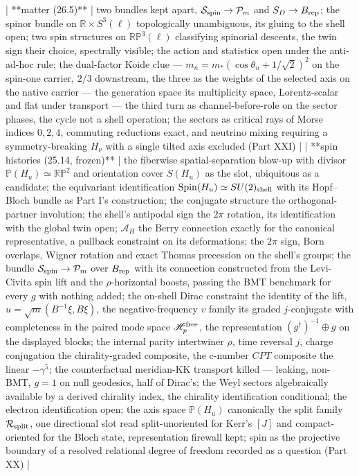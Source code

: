 | **matter (26.5)** | two bundles kept apart, $\mathcal S_{\rm spin}\to\mathcal P_m$ and $S_D\to B_{\rm rep}$; the spinor bundle on $\mathbb R\times S^3(\ell)$ topologically unambiguous, its gluing to the shell open; two spin structures on $\mathbb{RP}^3(\ell)$ classifying spinorial descents, the twin sign their choice, spectrally visible; the action and statistics open under the anti-ad-hoc rule; the dual-factor Koide clue — $m_n = m_*(\cos\theta_n+1/\sqrt2)^2$ on the spin-one carrier, $2/3$ downstream, the three as the weights of the selected axis on the native carrier — the generation space its multiplicity space, Lorentz-scalar and flat under transport — the third turn as channel-before-role on the sector phases, the cycle not a shell operation; the sectors as critical rays of Morse indices $0,2,4$, commuting reductions exact, and neutrino mixing requiring a symmetry-breaking $H_\nu$ with a single tilted axis excluded (Part XXI) |
| **spin histories (25.14, frozen)** | the fiberwise spatial-separation blow-up with divisor $\mathbb P(H_u)\simeq\mathbb{RP}^2$ and orientation cover $S(H_u)$ as the slot, ubiquitous as a candidate; the equivariant identification ${\rm Spin}(H_u)\simeq SU(2)_{\rm shell}$ with its Hopf–Bloch bundle as Part I's construction; the conjugate structure the orthogonal-partner involution; the shell's antipodal sign the $2\pi$ rotation, its identification with the global twin open; $\mathcal A_H$ the Berry connection exactly for the canonical representative, a pullback constraint on its deformations; the $2\pi$ sign, Born overlaps, Wigner rotation and exact Thomas precession on the shell's groups; the bundle $\mathcal S_{\rm spin}\to\mathcal P_m$ over $B_{\rm rep}$ with its connection constructed from the Levi-Civita spin lift and the $\rho$-horizontal boosts, passing the BMT benchmark for every $g$ with nothing added; the on-shell Dirac constraint the identity of the lift, $u = \sqrt m(B^{-1}\xi,B\xi)$, the negative-frequency $v$ family its graded $j$-conjugate with completeness in the paired mode space $\mathscr H^{\rm free}_p$, the representation $(g^\dagger)^{-1}\oplus g$ on the displayed blocks; the internal parity intertwiner $\rho$, time reversal $j$, charge conjugation the chirality-graded composite, the c-number $CPT$ composite the linear $-\gamma^5$; the counterfactual meridian-KK transport killed — leaking, non-BMT, $g = 1$ on null geodesics, half of Dirac's; the Weyl sectors algebraically available by a derived chirality index, the chirality identification conditional; the electron identification open; the axis space $\mathbb P(H_u)$ canonically the split family $\mathcal R_{\rm split}$, one directional slot read split-unoriented for Kerr's $[J]$ and compact-oriented for the Bloch state, representation firewall kept; spin as the projective boundary of a resolved relational degree of freedom recorded as a question (Part XX) |
